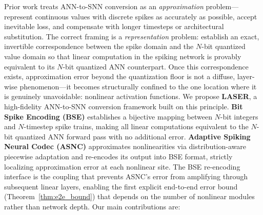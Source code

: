 \documentclass{article}
\theoremstyle{plain}
\theoremstyle{definition}
\theoremstyle{remark}
\begin{document}
Prior work treats ANN-to-SNN conversion as an \emph{approximation} problem---represent
continuous values with discrete spikes as accurately as possible, accept inevitable loss, and compensate with longer timesteps or architectural substitution. The correct framing is a \emph{representation} problem: establish an exact, invertible correspondence between the spike domain and the $N$-bit quantized value domain so that linear computation in the spiking network is provably equivalent to its $N$-bit quantized ANN counterpart. Once this correspondence exists, approximation error beyond the quantization floor is not a diffuse, layer-wise phenomenon---it becomes structurally confined to the one location where it is genuinely unavoidable: nonlinear activation functions.
%
We propose \textbf{LASER}, a high-fidelity ANN-to-SNN conversion framework built on
this principle. \textbf{Bit Spike Encoding (BSE)} establishes a bijective mapping between $N$-bit integers and $N$-timestep spike trains, making all linear computations equivalent to the $N$-bit quantized ANN forward pass with no additional error. \textbf{Adaptive Spiking Neural Codec (ASNC)} approximates nonlinearities via distribution-aware piecewise adaptation and re-encodes its output into BSE format, strictly localizing approximation error at each nonlinear site. The BSE re-encoding interface is the coupling that prevents ASNC's error from amplifying through subsequent linear layers, enabling the first explicit end-to-end error bound (Theorem~\ref{thm:e2e_bound}) that depends on the number of nonlinear modules rather than network depth.
Our main contributions are:
\end{document}
